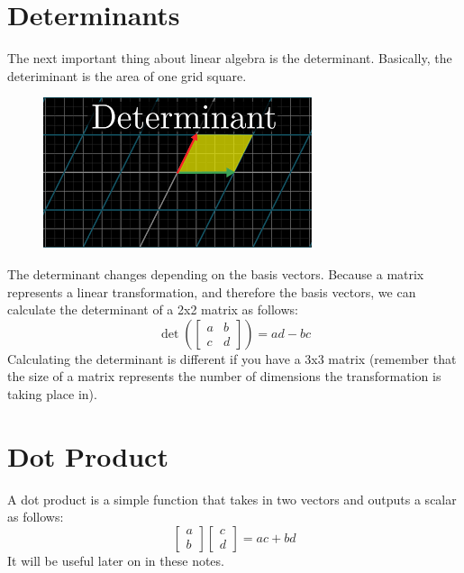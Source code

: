 \section{Determinants}
The next important thing about linear algebra is the determinant. Basically, the deteriminant is the area of one grid square.
\begin{center}
\begin{figure}[H]
\includegraphics[scale=0.5]{determinant.png}
\end{figure}
\end{center}
The determinant changes depending on the basis vectors. Because a matrix represents a linear transformation, and therefore the basis vectors, we can calculate the determinant of a 2x2 matrix as follows:
\begin{equation*}
\det\left(\begin{bmatrix}a&b\\c&d\end{bmatrix}\right)=ad-bc
\end{equation*}
Calculating the determinant is different if you have a 3x3 matrix (remember that the size of a matrix represents the number of dimensions the transformation is taking place in).
\section{Dot Product}
A dot product is a simple function that takes in two vectors and outputs a scalar as follows:
\begin{equation*}
\begin{bmatrix}a\\b\end{bmatrix}\begin{bmatrix}c\\d\end{bmatrix}=ac+bd
\end{equation*}
It will be useful later on in these notes.
